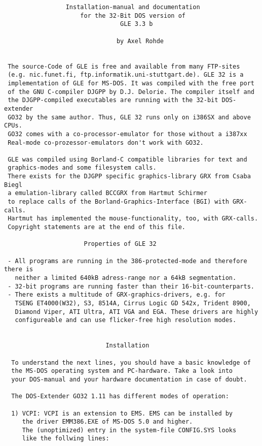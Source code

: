\begin{center}
\begin{minipage}[t]{11.0cm}
{\scriptsize
\begin{verbatim}
                 Installation-manual and documentation 
                     for the 32-Bit DOS version of
                                GLE 3.3 b 

                               by Axel Rohde


 The source-Code of GLE is free and available from many FTP-sites
 (e.g. nic.funet.fi, ftp.informatik.uni-stuttgart.de). GLE 32 is a
 implementation of GLE for MS-DOS. It was compiled with the free port
 of the GNU C-compiler DJGPP by D.J. Delorie. The compiler itself and
 the DJGPP-compiled executables are running with the 32-bit DOS-extender
 GO32 by the same author. Thus, GLE 32 runs only on i386SX and above CPUs.
 GO32 comes with a co-processor-emulator for those without a i387xx
 Real-mode co-prozessor-emulators don't work with GO32. 

 GLE was compiled using Borland-C compatible libraries for text and
 graphics-modes and some filesystem calls.
 There exists for the DJGPP specific graphics-library GRX from Csaba Biegl
 a emulation-library called BCCGRX from Hartmut Schirmer
 to replace calls of the Borland-Graphics-Interface (BGI) with GRX-calls.
 Hartmut has implemented the mouse-functionality, too, with GRX-calls.
 Copyright statements are at the end of this file.

                      Properties of GLE 32

 - All programs are running in the 386-protected-mode and therefore there is
   neither a limited 640kB adress-range nor a 64kB segmentation.
 - 32-bit programs are running faster than their 16-bit-counterparts.
 - There exists a multitude of GRX-graphics-drivers, e.g. for
   TSENG ET4000(W32), S3, 8514A, Cirrus Logic GD 542x, Trident 8900,
   Diamond Viper, ATI Ultra, ATI VGA and EGA. These drivers are highly
   configureable and can use flicker-free high resolution modes.

   
                            Installation

  To understand the next lines, you should have a basic knowledge of
  the MS-DOS operating system and PC-hardware. Take a look into
  your DOS-manual and your hardware documentation in case of doubt.
  
  The DOS-Extender GO32 1.11 has different modes of operation:

  1) VCPI: VCPI is an extension to EMS. EMS can be installed by
     the driver EMM386.EXE of MS-DOS 5.0 and higher.
     The (unoptimized) entry in the system-file CONFIG.SYS looks
     like the follwing lines:
     

\end{verbatim}}
\end{minipage}
\end{center}
